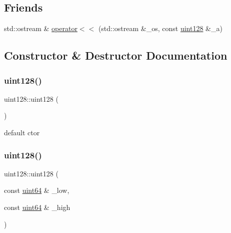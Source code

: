 \subsection*{Friends}
\begin{DoxyCompactItemize}
\item 
std\+::ostream \& \hyperlink{classuint128_a3981a0cf6398b930fa55fa5c5e802a65}{operator$<$$<$} (std\+::ostream \&\+\_\+os, const \hyperlink{classuint128}{uint128} \&\+\_\+a)
\end{DoxyCompactItemize}


\subsection{Constructor \& Destructor Documentation}
\mbox{\label{classuint128_abe535f8ff596b02234d94ab4c8d40933}} 
\subsubsection{\texorpdfstring{uint128()}{uint128()}\hspace{0.1cm}{\footnotesize\ttfamily [1/6]}}
{\footnotesize\ttfamily uint128\+::uint128 (\begin{DoxyParamCaption}{ }\end{DoxyParamCaption})\hspace{0.3cm}{\ttfamily [inline]}}



default ctor 

\mbox{\label{classuint128_a2b3acd15568d628cffb98f5c58f17ea9}} 
\subsubsection{\texorpdfstring{uint128()}{uint128()}\hspace{0.1cm}{\footnotesize\ttfamily [2/6]}}
{\footnotesize\ttfamily uint128\+::uint128 (\begin{DoxyParamCaption}\item[{const \hyperlink{types_8h_a60e8696a4678cd348e991a1f172e53f7}{uint64} \&}]{\+\_\+low,  }\item[{const \hyperlink{types_8h_a60e8696a4678cd348e991a1f172e53f7}{uint64} \&}]{\+\_\+high }\end{DoxyParamCaption})\hspace{0.3cm}{\ttfamily [inline]}}



